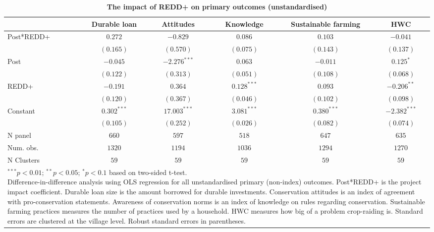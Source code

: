 \documentclass[
]{article}
\begin{document}
\begin{table}[h]
\caption{\textbf{The impact of REDD+ on primary outcomes (unstandardised)}}
\begin{center}
\begin{tabular}{l c c c c c}
\hline
 & Durable loan & Attitudes & Knowledge & Sustainable farming & HWC \\
\hline
Post*REDD+ & $0.272$       & $-0.829$       & $0.086$       & $0.103$       & $-0.041$       \\
           & $(0.165)$     & $(0.570)$      & $(0.075)$     & $(0.143)$     & $(0.137)$      \\
Post       & $-0.045$      & $-2.276^{***}$ & $0.063$       & $-0.011$      & $0.125^{*}$    \\
           & $(0.122)$     & $(0.313)$      & $(0.051)$     & $(0.108)$     & $(0.068)$      \\
REDD+      & $-0.191$      & $0.364$        & $0.128^{***}$ & $0.093$       & $-0.206^{**}$  \\
           & $(0.120)$     & $(0.367)$      & $(0.046)$     & $(0.102)$     & $(0.098)$      \\
Constant   & $0.302^{***}$ & $17.003^{***}$ & $3.081^{***}$ & $0.380^{***}$ & $-2.382^{***}$ \\
           & $(0.105)$     & $(0.252)$      & $(0.026)$     & $(0.082)$     & $(0.074)$      \\
\hline
N panel    & $660$         & $597$          & $518$         & $647$         & $635$          \\
Num. obs.  & $1320$        & $1194$         & $1036$        & $1294$        & $1270$         \\
N Clusters & $59$          & $59$           & $59$          & $59$          & $59$           \\
\hline
\multicolumn{6}{l}{\scriptsize{\parbox{.88\linewidth}{\vspace{2pt}$^{***}p<0.01$; $^{**}p<0.05$; $^{*}p<0.1$ based on two-sided t-test.\\
       Difference-in-difference analysis using OLS regression for all unstandardised primary (non-index) outcomes. Post*REDD+ is the project impact coefficient. Durable loan size is the amount borrowed for durable investments. Conservation attitudes is an index of agreement with pro-conservation statements. Awareness of conservation norms is an index of knowledge on rules regarding conservation. Sustainable farming practices measures the number of practices used by a household. HWC measures how big of a problem crop-raiding is. Standard errors are clustered at the village level. Robust standard errors in parentheses.}}}
\end{tabular}
\label{table:coefficients}
\end{center}
\end{table}
\end{document}
